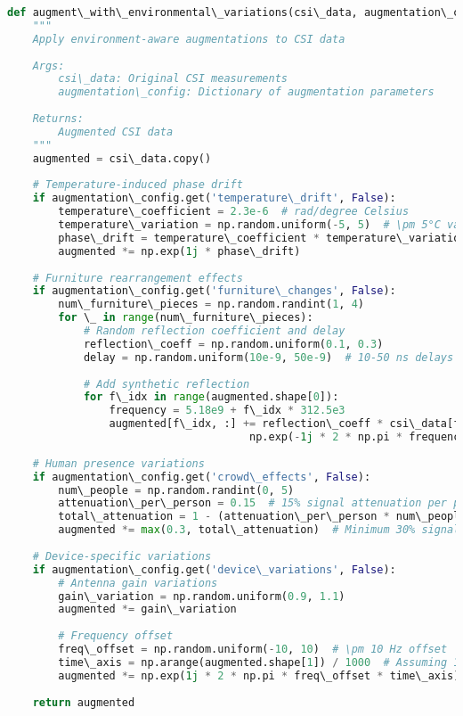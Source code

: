 \documentclass[journal]{IEEEtran}
\begin{document}
\begin{lstlisting}[language=Python, caption=Environment-Aware Data Augmentation]
def augment\_with\_environmental\_variations(csi\_data, augmentation\_config):
    """
    Apply environment-aware augmentations to CSI data
    
    Args:
        csi\_data: Original CSI measurements
        augmentation\_config: Dictionary of augmentation parameters
    
    Returns:
        Augmented CSI data
    """
    augmented = csi\_data.copy()
    
    # Temperature-induced phase drift
    if augmentation\_config.get('temperature\_drift', False):
        temperature\_coefficient = 2.3e-6  # rad/degree Celsius
        temperature\_variation = np.random.uniform(-5, 5)  # \pm 5°C variation
        phase\_drift = temperature\_coefficient * temperature\_variation * np.arange(csi\_data.shape[1])
        augmented *= np.exp(1j * phase\_drift)
    
    # Furniture rearrangement effects
    if augmentation\_config.get('furniture\_changes', False):
        num\_furniture\_pieces = np.random.randint(1, 4)
        for \_ in range(num\_furniture\_pieces):
            # Random reflection coefficient and delay
            reflection\_coeff = np.random.uniform(0.1, 0.3)
            delay = np.random.uniform(10e-9, 50e-9)  # 10-50 ns delays
            
            # Add synthetic reflection
            for f\_idx in range(augmented.shape[0]):
                frequency = 5.18e9 + f\_idx * 312.5e3
                augmented[f\_idx, :] += reflection\_coeff * csi\_data[f\_idx, :] * \
                                      np.exp(-1j * 2 * np.pi * frequency * delay)
    
    # Human presence variations
    if augmentation\_config.get('crowd\_effects', False):
        num\_people = np.random.randint(0, 5)
        attenuation\_per\_person = 0.15  # 15% signal attenuation per person
        total\_attenuation = 1 - (attenuation\_per\_person * num\_people)
        augmented *= max(0.3, total\_attenuation)  # Minimum 30% signal strength
    
    # Device-specific variations
    if augmentation\_config.get('device\_variations', False):
        # Antenna gain variations
        gain\_variation = np.random.uniform(0.9, 1.1)
        augmented *= gain\_variation
        
        # Frequency offset
        freq\_offset = np.random.uniform(-10, 10)  # \pm 10 Hz offset
        time\_axis = np.arange(augmented.shape[1]) / 1000  # Assuming 1kHz sampling
        augmented *= np.exp(1j * 2 * np.pi * freq\_offset * time\_axis)
    
    return augmented
\end{lstlisting}
\end{document}
